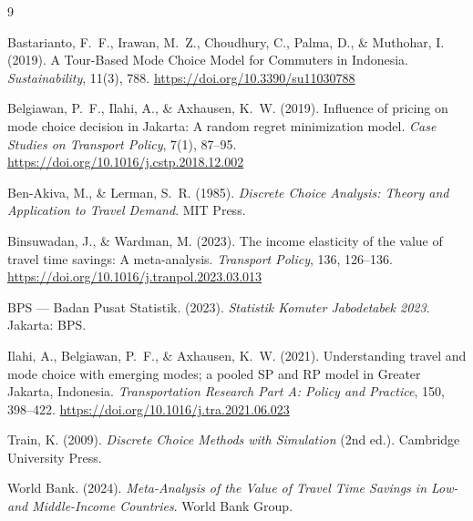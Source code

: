 \documentclass[12pt,a4paper]{article}
\begin{document}
\begin{thebibliography}{9}

Bastarianto, F.~F., Irawan, M.~Z., Choudhury, C., Palma, D., \& Muthohar, I. (2019).
A Tour-Based Mode Choice Model for Commuters in Indonesia.
\textit{Sustainability}, 11(3), 788.
\url{https://doi.org/10.3390/su11030788}

Belgiawan, P.~F., Ilahi, A., \& Axhausen, K.~W. (2019).
Influence of pricing on mode choice decision in Jakarta: A random regret minimization model.
\textit{Case Studies on Transport Policy}, 7(1), 87--95.
\url{https://doi.org/10.1016/j.cstp.2018.12.002}

Ben-Akiva, M., \& Lerman, S.~R. (1985).
\textit{Discrete Choice Analysis: Theory and Application to Travel Demand}.
MIT Press.

Binsuwadan, J., \& Wardman, M. (2023).
The income elasticity of the value of travel time savings: A meta-analysis.
\textit{Transport Policy}, 136, 126--136.
\url{https://doi.org/10.1016/j.tranpol.2023.03.013}

BPS --- Badan Pusat Statistik. (2023).
\textit{Statistik Komuter Jabodetabek 2023}.
Jakarta: BPS.

Ilahi, A., Belgiawan, P.~F., \& Axhausen, K.~W. (2021).
Understanding travel and mode choice with emerging modes; a pooled SP and RP model in Greater Jakarta, Indonesia.
\textit{Transportation Research Part A: Policy and Practice}, 150, 398--422.
\url{https://doi.org/10.1016/j.tra.2021.06.023}

Train, K. (2009).
\textit{Discrete Choice Methods with Simulation} (2nd ed.).
Cambridge University Press.

World Bank. (2024).
\textit{Meta-Analysis of the Value of Travel Time Savings in Low- and Middle-Income Countries}.
World Bank Group.

\end{thebibliography}
\end{document}
